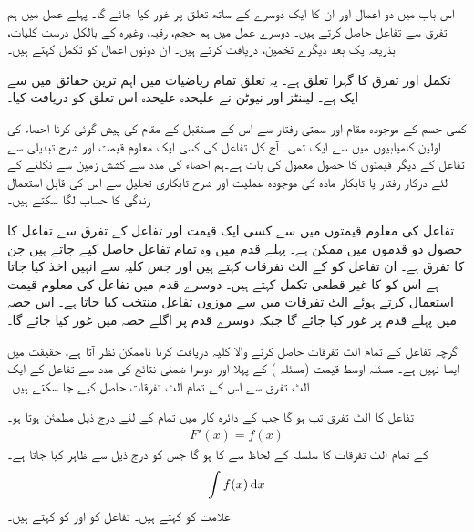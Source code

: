 اس باب میں دو اعمال اور ان کا ایک دوسرے کے ساتھ تعلق پر غور کیا جائے گا۔ پہلے عمل میں  ہم تفرق سے تفاعل  حاصل کرتے ہیں۔ دوسرے عمل میں ہم حجم، رقبہ، وغیرہ کے بالکل درست کلیات، بذریعہ یک بعد دیگرے تخمین، دریافت کرتے ہیں۔ ان دونوں اعمال کو تکمل کہتے ہیں۔

تکمل اور تفرق کا گہرا تعلق ہے۔ یہ تعلق تمام ریاضیات میں اہم ترین حقائق میں سے ایک ہے۔ لیبنٹز اور نیوٹن نے علیحدہ علیحدہ اس تعلق کو دریافت کیا۔

کسی جسم کے موجودہ مقام اور سمتی رفتار سے اس کے مستقبل کے  مقام کی پیش گوئی کرنا احصاء کی اولین کامیابیوں میں سے ایک تھی۔ آج کل تفاعل کی کسی  ایک معلوم قیمت اور شرح تبدیلی سے تفاعل کے دیگر قیمتوں کا حصول معمول کی بات ہے۔ہم احصاء کی مدد سے  کشش زمین سے نکلنے کے لئے درکار رفتار یا تابکار مادہ کی موجودہ عملیت اور شرح تابکاری تحلیل سے اس کی قابل استعمال زندگی کا حساب لگا سکتے ہیں۔

تفاعل کی معلوم قیمتوں میں سے کسی ایک قیمت اور تفاعل کے تفرق  سے تفاعل کا حصول دو قدموں میں ممکن ہے۔ پہلے قدم میں وہ تمام تفاعل حاصل کیے جاتے ہیں جن کا تفرق  ہے۔ ان تفاعل کو  کے الٹ تفرقات کہتے ہیں اور جس کلیہ سے انہیں اخذ کیا جاتا ہے اس کو  کا غیر قطعی  تکمل  کہتے ہیں۔ دوسرے قدم میں تفاعل کی معلوم قیمت استعمال کرتے ہوئے الٹ تفرقات میں سے موزوں تفاعل منتخب کیا جاتا ہے۔ اس حصہ میں پہلے قدم پر غور کیا جائے گا جبکہ دوسرے قدم پر اگلے حصہ میں غور کیا جائے گا۔

اگرچہ تفاعل کے تمام الٹ تفرقات حاصل کرنے والا کلیہ دریافت کرنا  ناممکن نظر آتا ہے، حقیقت میں ایسا نہیں ہے۔ مسئلہ اوسط قیمت (مسئلہ ) کے  پہلا اور دوسرا ضمنی نتائج کی مدد سے تفاعل کے  ایک الٹ تفرق سے اس کے تمام الٹ تفرقات حاصل کیے جا سکتے ہیں۔ 

تفاعل  کا  الٹ تفرق تب  ہو گا جب  کے دائرہ کار میں تمام  کے لئے درج ذیل مطمئن ہوتا ہو۔
\begin{align*}
F'(x)=f(x)
\end{align*}
 کے تمام الٹ تفرقات کا سلسلہ  کے لحاظ سے  کا  ہو گا جس کو درج ذیل سے ظاہر کیا جاتا ہے۔
\begin{align*}
\int f(x)\dif x
\end{align*}
علامت  کو  کہتے ہیں۔ تفاعل  کو  اور  کو  کہتے ہیں۔

